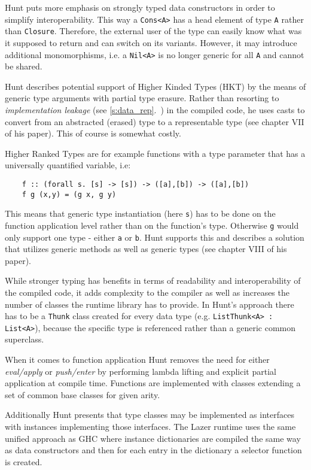 \documentclass[en]{pracamgr}
\newcommand{\myref}[1]{\ref{#1}.~\textit{\nameref{#1}}}
\begin{document}
Hunt puts more emphasis on strongly typed data constructors
in order to simplify interoperability.
This way a \verb|Cons<A>| has a head element of type \verb|A|
rather than \verb|Closure|. Therefore, the external user of the type
can easily know what was it supposed to return and can switch on
its variants. However, it may introduce additional monomorphisms,
i.e. a \verb|Nil<A>| is no longer generic for all \verb|A| and cannot be shared. 

Hunt describes potential support of Higher Kinded Types (HKT)
by the means of generic type arguments
with partial type erasure. Rather than resorting to
\textit{implementation leakage} (see \myref{s:data_rep})
in the compiled code, he uses casts to convert from an abstracted
(erased) type to a representable type (see chapter VII of his paper).
This of course is somewhat costly.

Higher Ranked Types are for example functions with a type parameter
that has a universally quantified variable, i.e:

\begin{verbatim}
    f :: (forall s. [s] -> [s]) -> ([a],[b]) -> ([a],[b])
    f g (x,y) = (g x, g y)\end{verbatim}

This means that generic type instantiation (here \verb|s|) has to be done on the
function application level rather than on the function's type.
Otherwise \verb|g| would only support one type - either \verb|a| or \verb|b|.
Hunt supports this and describes a solution that utilizes
generic methods as well as generic types (see chapter VIII of his paper).

While stronger typing has benefits in terms of readability and
interoperability of the compiled code, it adds complexity to the compiler
as well as increases the number of classes the runtime library has to provide.
In Hunt's approach there has to be a \verb|Thunk| class created for every
data type (e.g. \verb|ListThunk<A> : List<A>|), because the specific type is referenced rather
than a generic common superclass.

When it comes to function application Hunt removes the need
for either \textit{eval/apply} or \textit{push/enter} by
performing lambda lifting and explicit partial application
at compile time. Functions are implemented with classes
extending a set of common base classes for given arity.

Additionally Hunt presents that type classes
may be implemented as interfaces with instances implementing those interfaces.
The Lazer runtime uses the same unified approach as GHC
where instance dictionaries are compiled the same way
as data constructors and then for each entry in the dictionary
a selector function is created.
\end{document}
